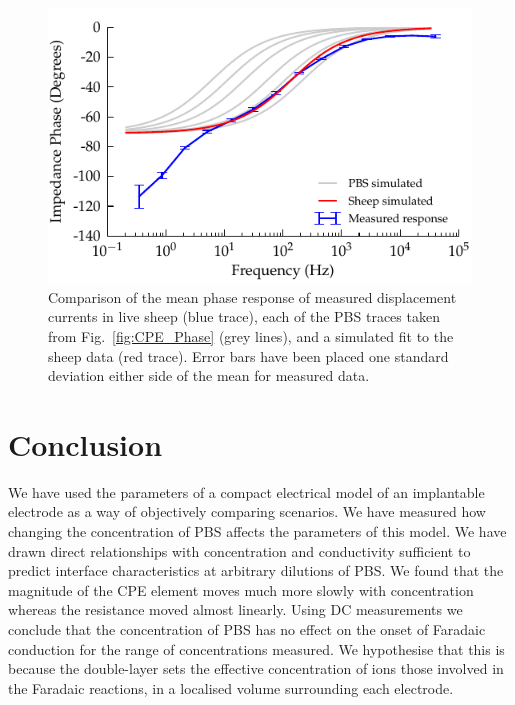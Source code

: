 \documentclass[journal, a4paper]{IEEEtran}
\begin{document}
\begin{figure}
    \begin{center}
        \includegraphics{graphics/displacement-withSheep_impedanceVsFrequency_phase}
    \end{center}
    \caption{Comparison of the mean phase response of measured displacement currents in live sheep (blue trace), each of the PBS traces taken from Fig.~\ref{fig:CPE_Phase} (grey lines), and a simulated fit to the sheep data (red trace). Error bars have been placed one standard deviation either side of the mean for measured data.}
    \label{fig:displacement_sheepCPEPhase}
\end{figure}





\section{Conclusion}
\label{sect:conclusion}
We have used the parameters of a compact electrical model of an implantable electrode as a way of objectively comparing scenarios.
We have measured how changing the concentration of PBS affects the parameters of this model.
We have drawn direct relationships with concentration and conductivity sufficient to predict interface characteristics at arbitrary dilutions of PBS.
We found that the magnitude of the CPE element moves much more slowly with concentration whereas the resistance moved almost linearly.
Using DC measurements we conclude that the concentration of PBS has no effect on the onset of Faradaic conduction for the range of concentrations measured. We hypothesise that this is because the double-layer sets the effective concentration of ions those involved in the Faradaic reactions, in a localised volume surrounding each electrode.
\end{document}
